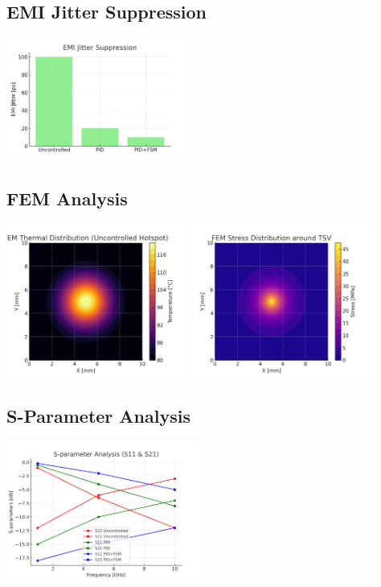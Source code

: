 \documentclass[conference]{IEEEtran}
\begin{document}
\subsection{EMI Jitter Suppression}
\includegraphics[width=0.45\textwidth]{sim_emi_jitter.png}

\subsection{FEM Analysis}
\includegraphics[width=0.45\textwidth]{fem_thermal_map.png}
\includegraphics[width=0.45\textwidth]{fem_stress_map.png}

\subsection{S-Parameter Analysis}
\includegraphics[width=0.48\textwidth]{sparam_s11s21.png}
\end{document}
